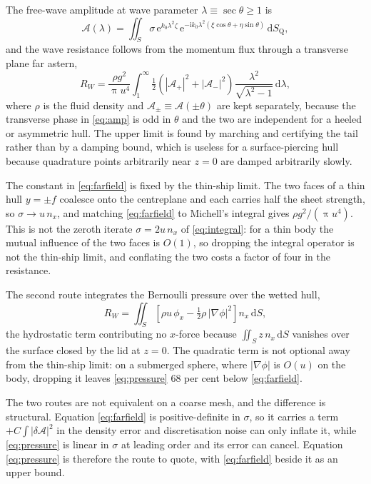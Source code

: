 \documentclass[11pt]{article}
\begin{document}
The free-wave amplitude at wave parameter $\lambda \equiv \sec\theta \ge 1$ is
\begin{equation}
\mathcal{A}(\lambda) = \iint_S \sigma\,
\mathrm{e}^{k_0\lambda^2\zeta}\,
\mathrm{e}^{-\mathrm{i}k_0\lambda^2(\xi\cos\theta + \eta\sin\theta)}\,
\mathrm{d}S_\mathrm{Q},
\label{eq:amp}
\end{equation}
and the wave resistance follows from the momentum flux through a transverse plane far
astern,
\begin{equation}
R_W = \frac{\rho g^2}{\uppi u^4}\int_1^\infty
\tfrac{1}{2}\left(|\mathcal{A}_+|^2 + |\mathcal{A}_-|^2\right)
\frac{\lambda^2}{\sqrt{\lambda^2-1}}\,\mathrm{d}\lambda ,
\label{eq:farfield}
\end{equation}
where $\rho$ is the fluid density and $\mathcal{A}_\pm \equiv \mathcal{A}(\pm\theta)$ are
kept separately, because the transverse phase in \eqref{eq:amp} is odd in $\theta$ and the
two are independent for a heeled or asymmetric hull. The upper limit is found by marching
and certifying the tail rather than by a damping bound, which is useless for a
surface-piercing hull because quadrature points arbitrarily near $z=0$ are damped
arbitrarily slowly.

The constant in \eqref{eq:farfield} is fixed by the thin-ship limit. The two faces of a
thin hull $y = \pm f$ coalesce onto the centreplane and each carries half the sheet
strength, so $\sigma \to u\,n_x$, and matching \eqref{eq:farfield} to Michell's integral
\citep{michell1898} gives $\rho g^2/(\uppi u^4)$. This is not the zeroth iterate
$\sigma = 2u\,n_x$ of \eqref{eq:integral}: for a thin body the mutual influence of the two
faces is $O(1)$, so dropping the integral operator is not the thin-ship limit, and
conflating the two costs a factor of four in the resistance.

The second route integrates the Bernoulli pressure over the wetted hull,
\begin{equation}
R_W = \iint_S \left[\rho u\,\phi_x - \tfrac{1}{2}\rho\,|\nabla\phi|^2\right]
n_x\,\mathrm{d}S ,
\label{eq:pressure}
\end{equation}
the hydrostatic term contributing no $x$-force because $\iint_S z\,n_x\,\mathrm{d}S$
vanishes over the surface closed by the lid at $z=0$. The quadratic term is not optional
away from the thin-ship limit: on a submerged sphere, where $|\nabla\phi|$ is $O(u)$ on
the body, dropping it leaves \eqref{eq:pressure} 68 per cent below \eqref{eq:farfield}.

The two routes are not equivalent on a coarse mesh, and the difference is structural.
Equation \eqref{eq:farfield} is positive-definite in $\sigma$, so it carries a term
$+C\int|\delta\mathcal{A}|^2$ in the density error and discretisation noise can only
inflate it, while \eqref{eq:pressure} is linear in $\sigma$ at leading order and its error
can cancel. Equation \eqref{eq:pressure} is therefore the route to quote, with
\eqref{eq:farfield} beside it as an upper bound.
\end{document}
